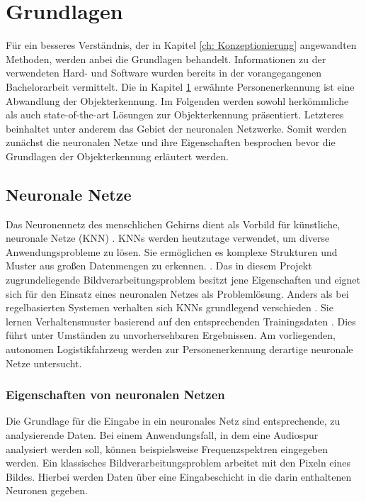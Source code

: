 \chapter{Grundlagen}
\label{ch: Grundlagen}
	Für ein besseres Verständnis, der in Kapitel \ref{ch: Konzeptionierung} angewandten Methoden, werden anbei die Grundlagen behandelt. Informationen zu der verwendeten Hard- und Software wurden bereits in der vorangegangenen Bachelorarbeit vermittelt. Die in Kapitel \ref{ch: Grundlagen} erwähnte Personenerkennung ist eine Abwandlung der Objekterkennung. Im Folgenden werden sowohl herkömmliche als auch state-of-the-art Lösungen zur Objekterkennung präsentiert. Letzteres beinhaltet unter anderem das Gebiet der neuronalen Netzwerke. Somit werden zunächst die neuronalen Netze und ihre Eigenschaften besprochen bevor die Grundlagen der Objekterkennung erläutert werden. 
 
	
 	\section{Neuronale Netze}
	\label{sec: ROS}
	
	Das Neuronennetz des menschlichen Gehirns dient als Vorbild für künstliche, neuronale Netze (KNN) \cite{neuronennetz}. KNNs werden heutzutage verwendet, um diverse Anwendungsprobleme zu lösen.
	Sie ermöglichen es komplexe Strukturen und Muster aus großen Datenmengen zu erkennen.
	\cite{neuronennetz}. Das in diesem Projekt zugrundeliegende Bildverarbeitungsproblem besitzt jene Eigenschaften und eignet sich für den Einsatz eines neuronalen Netzes als Problemlösung. Anders als bei regelbasierten Systemen verhalten sich KNNs grundlegend verschieden \cite{proba}. Sie lernen Verhaltensmuster basierend auf den entsprechenden Trainingsdaten \cite{proba}. Dies führt unter Umständen zu unvorhersehbaren Ergebnissen. Am vorliegenden, autonomen Logistikfahrzeug werden zur Personenerkennung derartige neuronale Netze untersucht.
	
		\subsection{Eigenschaften von neuronalen Netzen}
		\label{subsec: Eigenschaften von neuronalen Netzen}
		Die Grundlage für die Eingabe in ein neuronales Netz sind entsprechende, zu analysierende Daten. Bei einem Anwendungsfall, in dem eine Audiospur analysiert werden soll, können beispielsweise Frequenzspektren eingegeben werden. Ein klassisches Bildverarbeitungsproblem arbeitet mit den Pixeln eines Bildes. Hierbei werden Daten über eine Eingabeschicht in die darin enthaltenen Neuronen gegeben. \\
		
